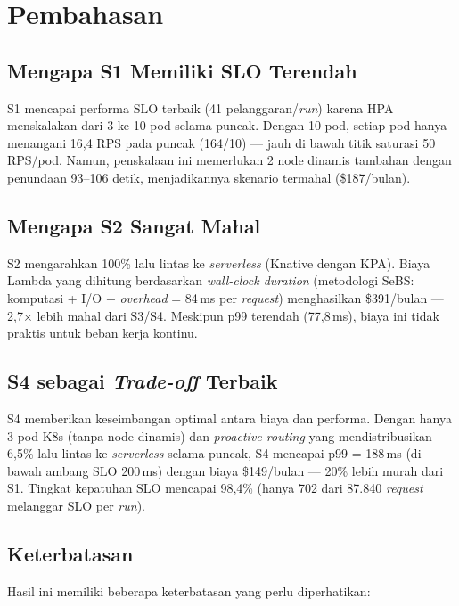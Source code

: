 \section{Pembahasan}
\label{sec:discussion}

\subsection{Mengapa S1 Memiliki SLO Terendah}

S1 mencapai performa SLO terbaik (41 pelanggaran/\emph{run}) karena HPA menskalakan dari 3 ke 10 pod selama puncak. Dengan 10 pod, setiap pod hanya menangani 16,4 RPS pada puncak (164/10) — jauh di bawah titik saturasi 50 RPS/pod. Namun, penskalaan ini memerlukan 2 node dinamis tambahan dengan penundaan 93--106 detik, menjadikannya skenario termahal (\$187/bulan).

\subsection{Mengapa S2 Sangat Mahal}

S2 mengarahkan 100\% lalu lintas ke \emph{serverless} (Knative dengan KPA). Biaya Lambda yang dihitung berdasarkan \emph{wall-clock duration} (metodologi SeBS: komputasi + I/O + \emph{overhead} = 84\,ms per \emph{request}) menghasilkan \$391/bulan — 2,7$\times$ lebih mahal dari S3/S4. Meskipun p99 terendah (77,8\,ms), biaya ini tidak praktis untuk beban kerja kontinu.

\subsection{S4 sebagai \emph{Trade-off} Terbaik}

S4 memberikan keseimbangan optimal antara biaya dan performa. Dengan hanya 3 pod K8s (tanpa node dinamis) dan \emph{proactive routing} yang mendistribusikan 6,5\% lalu lintas ke \emph{serverless} selama puncak, S4 mencapai p99 = 188\,ms (di bawah ambang SLO 200\,ms) dengan biaya \$149/bulan — 20\% lebih murah dari S1. Tingkat kepatuhan SLO mencapai 98,4\% (hanya 702 dari 87.840 \emph{request} melanggar SLO per \emph{run}).

\subsection{Keterbatasan}

Hasil ini memiliki beberapa keterbatasan yang perlu diperhatikan:

